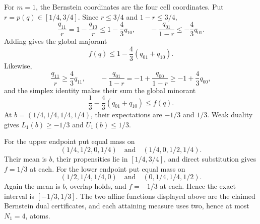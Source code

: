 For \(m=1\), the Bernstein coordinates are the four cell coordinates.  Put \(r=p(q)\in[1/4,3/4]\).  Since \(r\leq3/4\) and \(1-r\leq3/4\),
\[
 \frac{q_{11}}r=1-\frac{q_{10}}r\leq1-\frac43q_{10},
 \qquad
 -\frac{q_{01}}{1-r}\leq-\frac43q_{01}.
\]
Adding gives the global majorant
\[
 f(q)\leq1-\frac43(q_{01}+q_{10}).
\]
Likewise,
\[
 \frac{q_{11}}r\geq\frac43q_{11},
 \qquad
 -\frac{q_{01}}{1-r}=-1+\frac{q_{00}}{1-r}\geq-1+\frac43q_{00},
\]
and the simplex identity makes their sum the global minorant
\[
 \frac13-\frac43(q_{01}+q_{10})\leq f(q).
\]
At \(b=(1/4,1/4,1/4,1/4)\), their expectations are \(-1/3\) and \(1/3\).  Weak duality gives \(L_1(b)\geq-1/3\) and \(U_1(b)\leq1/3\).

For the upper endpoint put equal mass on
\[
 (1/4,1/2,0,1/4)
 \quad\text{and}\quad
 (1/4,0,1/2,1/4).
\]
Their mean is \(b\), their propensities lie in \([1/4,3/4]\), and direct substitution gives \(f=1/3\) at each.  For the lower endpoint put equal mass on
\[
 (1/2,1/4,1/4,0)
 \quad\text{and}\quad
 (0,1/4,1/4,1/2).
\]
Again the mean is \(b\), overlap holds, and \(f=-1/3\) at each.  Hence the exact interval is \([-1/3,1/3]\).  The two affine functions displayed above are the claimed Bernstein dual certificates, and each attaining measure uses two, hence at most \(N_1=4\), atoms.
